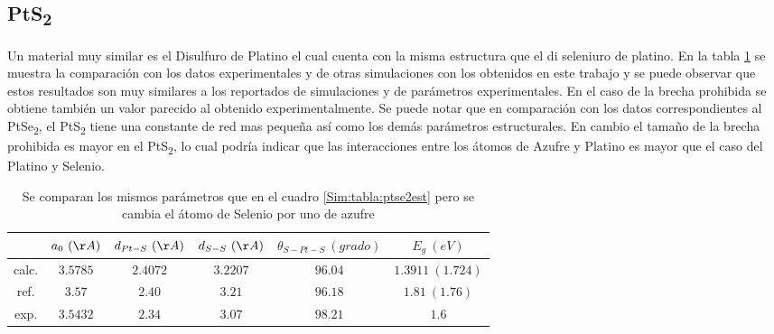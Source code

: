 \subsection{PtS\textsubscript{2}} \label{Sim:subsec:pts2celu}
Un material muy similar  es el Disulfuro de Platino el cual cuenta con la misma estructura que el di seleniuro de platino. En la tabla \ref{Sim:tabla:pts2est} se muestra la comparaci\'on con los datos experimentales y de otras simulaciones con los obtenidos en este trabajo y se puede observar que estos resultados son muy similares a los reportados de simulaciones y de par\'ametros experimentales. En el caso de la brecha prohibida se obtiene tambi\'en un valor parecido al obtenido experimentalmente. Se puede notar que en comparaci\'on con los datos correspondientes al PtSe\textsubscript{2}, el PtS\textsubscript{2} tiene una constante de red mas peque\~na as\'i como los dem\'as par\'ametros estructurales. En cambio el tama\~no de la brecha prohibida es mayor en el PtS\textsubscript{2}, lo cual podr\'ia indicar que las interacciones entre los \'atomos de Azufre y Platino es mayor que el caso del Platino y Selenio.
\begin{table}
	\centering
	\caption[Comparaci\'on de par\'ametros estructurales del PtS\textsubscript{2}.]{Se comparan los mismos par\'ametros que en el cuadro \ref{Sim:tabla:ptse2est} pero se cambia el \'atomo de Selenio por uno de azufre }
	\begin{tabular}{|c|c|c|c|c|c|}
		\hline
		& $a_0~(\AA)$   & $d_{Pt-S}~(\AA)$  & $d_{S-S}~(\AA)$  &  $\theta_{S-Pt-S}~(grado)$ & $E_g~(eV)$ \\
		\hline
		\hline
		calc.   & $3.5785$& $2.4072 $     & $3.2207 $  & $96.04$              & $1.3911 ~(1.724)$\\
		ref. \cite{doi:10.1021/jp405808a,DU201}    & $3.57$& $2.40 $     & $3.21 $  & $96.18$              & $1.81 ~(1.76)$\\
		exp. \cite{datexpPt,https://doi.org/10.1002/adma.201504572}   & $3.5432$& $2.34 $     & $3.07 $  & $98.21$              & $1.6$\\
		\hline
		
	\end{tabular}
	\label{Sim:tabla:pts2est}
\end{table}
\newline
